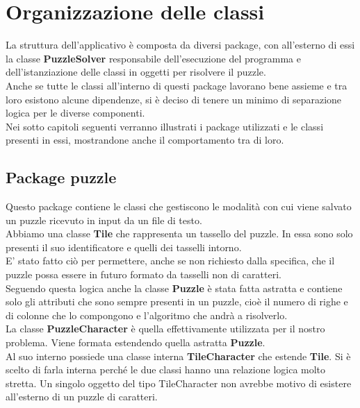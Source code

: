 % 
%
%

\section{Organizzazione delle classi}
La struttura dell'applicativo è composta da diversi package, con all'esterno di essi la classe \textbf{PuzzleSolver} responsabile dell'esecuzione del programma e dell'istanziazione delle classi in oggetti per risolvere il puzzle. \\
Anche se tutte le classi all'interno di questi package lavorano bene assieme e tra loro esistono alcune dipendenze, si è deciso di tenere un minimo di separazione logica per le diverse componenti. \\
Nei sotto capitoli seguenti verranno illustrati i package utilizzati e le classi presenti in essi, mostrandone anche il comportamento tra di loro.

	\subsection{Package puzzle}
Questo package contiene le classi che gestiscono le modalità con cui viene salvato un puzzle ricevuto in input da un file di testo. \\
Abbiamo una classe \textbf{Tile} che rappresenta un tassello del puzzle. In essa sono solo presenti il suo identificatore e quelli dei tasselli intorno. \\
E' stato fatto ciò per permettere, anche se non richiesto dalla specifica, che il puzzle possa essere in futuro formato da tasselli non di caratteri. \\
Seguendo questa logica anche la classe \textbf{Puzzle} è stata fatta astratta e contiene solo gli attributi che sono sempre presenti in un puzzle, cioè il numero di righe e di colonne che lo compongono e l'algoritmo che andrà a risolverlo. \\
La classe \textbf{PuzzleCharacter} è quella effettivamente utilizzata per il nostro problema. Viene formata estendendo quella astratta \textbf{Puzzle}. \\
Al suo interno possiede una classe interna \textbf{TileCharacter} che estende \textbf{Tile}. Si è scelto di farla interna perché le due classi hanno una relazione logica molto stretta. Un singolo oggetto del tipo TileCharacter non avrebbe motivo di esistere all'esterno di un puzzle di caratteri. \\


